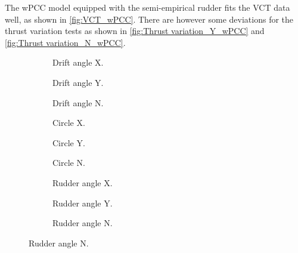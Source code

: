 The wPCC model equipped with the semi-empirical rudder fits the VCT data well, as shown in \autoref{fig:VCT_wPCC}. There are however some deviations for the thrust variation tests as shown in \autoref{fig:Thrust variation_Y_wPCC} and \autoref{fig:Thrust variation_N_wPCC}.
\begin{figure}[h]
     \centering
     \begin{subfigure}[b]{0.32\textwidth}
         \centering
         
        \caption{Drift angle X.}
        \label{fig:drift_angle_X_wPCC}
     \end{subfigure}
     \hfill
     \begin{subfigure}[b]{0.32\textwidth}
         \centering
         
        \caption{Drift angle Y.}
        \label{fig:drift_angle_Y_wPCC}
     \end{subfigure}
     \hfill
     \begin{subfigure}[b]{0.32\textwidth}
         \centering
         
        \caption{Drift angle N.}
        \label{fig:drift_angle_N_wPCC}
     \end{subfigure}
    \vfill
    
     \begin{subfigure}[b]{0.32\textwidth}
         \centering
         
        \caption{Circle X.}
        \label{fig:circle_X_wPCC}
     \end{subfigure}
     \hfill
     \begin{subfigure}[b]{0.32\textwidth}
         \centering
         
        \caption{Circle Y.}
        \label{fig:circle_Y_wPCC}
     \end{subfigure}
     \hfill
     \begin{subfigure}[b]{0.32\textwidth}
         \centering
         
        \caption{Circle N.}
        \label{fig:circle_N_wPCC}
     \end{subfigure}

    \vfill
     \begin{subfigure}[b]{0.32\textwidth}
         \centering
         
        \caption{Rudder angle X.}
        \label{fig:rudder_angle_X_wPCC}
     \end{subfigure}
     \hfill
     \begin{subfigure}[b]{0.32\textwidth}
         \centering
         
        \caption{Rudder angle Y.}
        \label{fig:rudder_angle_Y_wPCC}
     \end{subfigure}
     \hfill
     \begin{subfigure}[b]{0.32\textwidth}
         \centering
         
        \caption{Rudder angle N.}
        \label{fig:rudder_angle_N_wPCC}
     \end{subfigure}


\end{figure}
